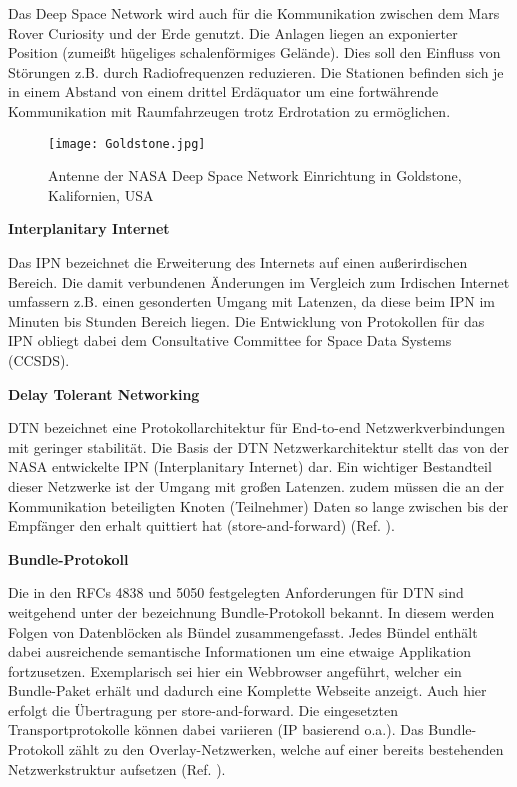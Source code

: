 Das Deep Space Network wird auch f{\"u}r die Kommunikation zwischen dem Mars
Rover Curiosity und der Erde genutzt. Die Anlagen liegen an exponierter Position
(zumei{\ss}t h{\"u}geliges schalenf{\"o}rmiges Gel{\"a}nde). Dies soll den
Einfluss von St{\"o}rungen z.B. durch Radiofrequenzen reduzieren. Die Stationen
befinden sich je in einem Abstand von einem drittel Erd{\"a}quator um eine
fortw{\"a}hrende Kommunikation mit Raumfahrzeugen trotz Erdrotation zu
erm{\"o}glichen.

\begin{figure}[H]
\centering
\texttt{[image: Goldstone.jpg]}
\caption{Antenne der NASA Deep Space Network Einrichtung in Goldstone,
Kalifornien, USA}
\label{fig:Goldstone}
\end{figure}

\textbf{Interplanitary Internet}

Das IPN bezeichnet die Erweiterung des Internets auf einen au{\ss}erirdischen
Bereich. Die damit verbundenen {\"A}nderungen im Vergleich zum Irdischen
Internet umfassern z.B. einen gesonderten Umgang mit Latenzen, da diese beim IPN
im Minuten bis Stunden Bereich liegen. Die Entwicklung von Protokollen
f{\"u}r das IPN obliegt dabei dem Consultative Committee for Space Data Systems
(CCSDS).

\textbf{Delay Tolerant Networking}

DTN bezeichnet eine Protokollarchitektur f{\"u}r End-to-end Netzwerkverbindungen
mit geringer stabilit{\"a}t. Die Basis der DTN Netzwerkarchitektur stellt das
von der NASA entwickelte IPN (Interplanitary Internet) dar. Ein wichtiger
Bestandteil dieser Netzwerke ist der Umgang mit gro{\ss}en Latenzen. zudem
m{\"u}ssen die an der Kommunikation beteiligten Knoten (Teilnehmer) Daten so
lange zwischen bis der Empf{\"a}nger den erhalt quittiert hat
(store-and-forward) (Ref. \cite{web3}).

\textbf{Bundle-Protokoll}

Die in den RFCs 4838 und 5050 festgelegten Anforderungen f{\"u}r DTN sind
weitgehend unter der bezeichnung Bundle-Protokoll bekannt. In diesem werden Folgen von
Datenbl{\"o}cken als B{\"u}ndel zusammengefasst. Jedes B{\"u}ndel enth{\"a}lt
dabei ausreichende semantische Informationen um eine etwaige Applikation
fortzusetzen. Exemplarisch sei hier ein Webbrowser angef{\"u}hrt, welcher ein
Bundle-Paket erh{\"a}lt und dadurch eine Komplette Webseite anzeigt. Auch hier
erfolgt die {\"U}bertragung per store-and-forward. Die eingesetzten
Transportprotokolle k{\"o}nnen dabei variieren (IP basierend o.a.). Das
Bundle-Protokoll z{\"a}hlt zu den Overlay-Netzwerken, welche auf einer bereits
bestehenden Netzwerkstruktur aufsetzen (Ref. \cite{web1}).

